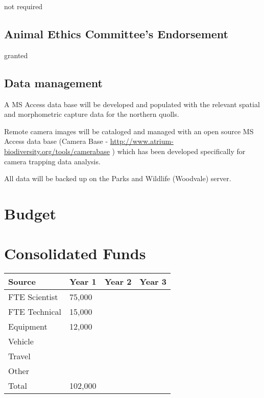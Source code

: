 \documentclass[version=last,
    paper=a4,                               %
    10pt,                                   %
    dvipsnames,
    oneside,                              %
    headings=openany,                       %
    open=any,
    BCOR=7mm,                               %
    DIV=15,     %
]{scrbook}
\begin{document}
not required




\subsection*{Animal Ethics Committee's Endorsement}

granted




\subsection*{Data management}

A MS Access data base will be developed and populated with the relevant
spatial and morphometric capture data for the northern quolls.~

Remote camera images will be cataloged and managed with an open source
MS Access data base (Camera Base -
\url{http://www.atrium-biodiversity.org/tools/camerabase} ) which has
been developed specifically for camera trapping data analysis.~

All data will be backed up on the Parks and Wildlife (Woodvale) server.




\section*{Budget}

\section*{Consolidated Funds }



\begin{longtabu} to \linewidth { |  X | X | X | X | }
\hline
{}
Source & Year 1 & Year 2 & Year 3\\
\hline
\endhead



FTE Scientist & 75,000 &  & \\



FTE Technical & 15,000 &  & \\



Equipment & 12,000 &  & \\



Vehicle &  &  & \\



Travel &  &  & \\



Other &  &  & \\



Total & 102,000 &  & \\


\hline
\end{longtabu}
\end{document}
